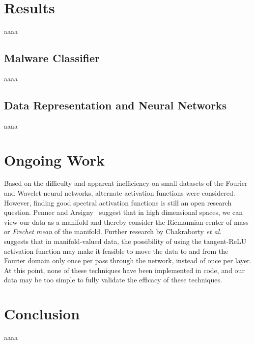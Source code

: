 \documentclass[10pt]{article}
\begin{document}
\section{Results}
aaaa

\subsection{Malware Classifier} \label{malware classifier}
aaaa

\subsection{Data Representation and Neural Networks} \label{data representation}
aaaa

\section{Ongoing Work}
Based on the difficulty and apparent inefficiency on small datasets of the Fourier and Wavelet neural networks, alternate activation functions were considered. 
However, finding good spectral activation functions is still an open research question.
Pennec and Arsigny~\cite{pennec2013information} suggest that in high dimensional spaces, we can view our data as a manifold and thereby consider the Riemannian center of mass or \textit{Frechet mean} of the manifold.
Further research by Chakraborty \textit{et al.}~\cite{chakraborty2019surreal} suggests that in manifold-valued data, the possibility of using the tangent-ReLU activation function may make it feasible to move the data to and from the Fourier domain only once per pass through the network, instead of once per layer.
At this point, none of these techniques have been implemented in code, and our data may be too simple to fully validate the efficacy of these techniques.

\section{Conclusion}
aaaa



\end{document}
